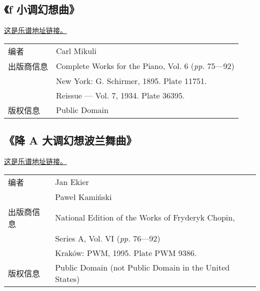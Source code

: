 \begin{appendices}
    \subsection{\heiti \fontsize{15}{18}\selectfont 《f 小调幻想曲》}
        \href{https://xrdrsp.github.io/uploads/2023/05/02/61-ekier.pdf}{这是乐谱地址链接。}
        \begin{longtable}{l l}
            编者 & Carl Mikuli \\ 
            出版商信息 & Complete Works for the Piano, Vol. 6 (\textit{pp.} 75—92)\\
            ~ & New York: G. Schirmer, 1895. Plate 11751.\\
            ~ & Reissue — Vol. 7, 1934. Plate 36395.\\
            版权信息 & Public Domain \cite{49}
        \end{longtable}
    
    \subsection{\heiti \fontsize{15}{18}\selectfont 《降 A 大调幻想波兰舞曲》}
        \href{https://xrdrsp.github.io/uploads/2023/05/02/61-ekier.pdf}{这是乐谱地址链接。}
        \begin{longtable}{l l}
            编者 & Jan Ekier \\
            ~ & Pawe\l{} Kamiński \\
            出版商信息 & National Edition of the Works of Fryderyk Chopin,\\
            ~ & Series A, Vol. VI (\textit{pp.} 76—92)\\
            ~ & Kraków: PWM, 1995. Plate PWM 9386.\\
            版权信息 & Public Domain (not Public Domain in the United States) \cite{61}
        \end{longtable}

    \end{appendices}

    \printbibliography[title={参考}]

